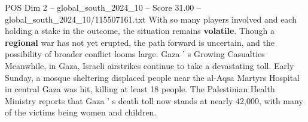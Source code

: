 \begin{textsample}{POS Dim 2 – global\_south\_2024\_10 – Score 31.00 – global\_south\_2024\_10/115507161.txt}
With so many players involved and each holding a stake in the outcome, the situation remains \textbf{volatile}.
Though a \textbf{regional} war has not yet erupted, the path forward is uncertain, and the possibility of broader conflict looms large.
Gaza ' s Growing Casualties Meanwhile, in Gaza, Israeli airstrikes continue to take a devastating toll.
Early Sunday, a mosque sheltering displaced people near the al-Aqsa Martyrs Hospital in central Gaza was hit, killing at least 18 people.
The Palestinian Health Ministry reports that Gaza ' s death toll now stands at nearly 42,000, with many of the victims being women and children.

\end{textsample}
